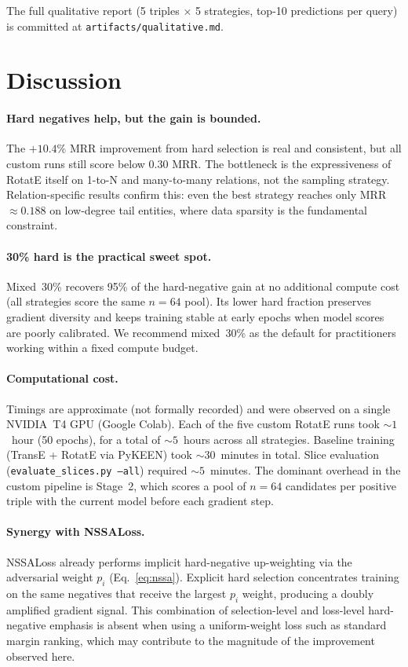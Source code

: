 \documentclass[10pt,twocolumn,letterpaper]{article}
\begin{document}
\noindent The full qualitative report (5 triples $\times$ 5 strategies, top-10
predictions per query) is committed at \texttt{artifacts/qualitative.md}.

\section{Discussion}
\label{sec:discussion}

\paragraph{Hard negatives help, but the gain is bounded.}
The $+10.4\%$ MRR improvement from hard selection is real and consistent, but
all custom runs still score below 0.30 MRR.
The bottleneck is the expressiveness of RotatE itself on 1-to-N and
many-to-many relations, not the sampling strategy.
Relation-specific results confirm this: even the best strategy reaches only
MRR~$\approx0.188$ on low-degree tail entities, where data sparsity is the
fundamental constraint.

\paragraph{30\% hard is the practical sweet spot.}
Mixed~30\% recovers 95\% of the hard-negative gain at no additional compute
cost (all strategies score the same $n=64$ pool). Its lower hard fraction
preserves gradient diversity and keeps training stable at early epochs when
model scores are poorly calibrated. We recommend mixed~30\% as the default
for practitioners working within a fixed compute budget.

\paragraph{Computational cost.}
Timings are approximate (not formally recorded) and were observed on a single
NVIDIA~T4 GPU (Google Colab).
Each of the five custom RotatE runs took $\sim\!1$~hour (50 epochs), for a
total of $\sim\!5$~hours across all strategies.
Baseline training (TransE + RotatE via PyKEEN) took $\sim\!30$~minutes in
total.
Slice evaluation (\texttt{evaluate\_slices.py --all}) required $\sim\!5$~minutes.
The dominant overhead in the custom pipeline is Stage~2, which scores a pool
of $n=64$ candidates per positive triple with the current model before each
gradient step.

\paragraph{Synergy with NSSALoss.}
NSSALoss already performs implicit hard-negative up-weighting via the
adversarial weight $p_i$ (Eq.~\ref{eq:nssa}). Explicit hard selection
concentrates training on the same negatives that receive the largest
$p_i$ weight, producing a doubly amplified gradient signal.
This combination of selection-level and loss-level hard-negative emphasis
is absent when using a uniform-weight loss such as standard margin ranking,
which may contribute to the magnitude of the improvement observed here.
\end{document}
